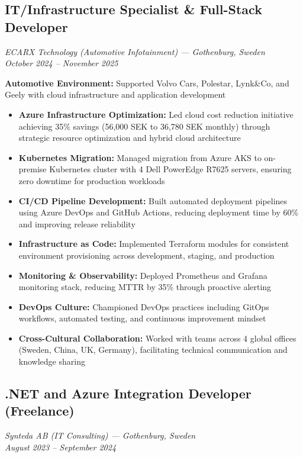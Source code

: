 \documentclass[10pt,a4paper]{article}
\begin{document}
\subsection*{IT/Infrastructure Specialist \& Full-Stack Developer}
\textit{ECARX Technology (Automotive Infotainment) — Gothenburg, Sweden}\\
\textit{October 2024 -- November 2025}

\textbf{Automotive Environment:} Supported Volvo Cars, Polestar, Lynk\&Co, and Geely with cloud infrastructure and application development

\begin{itemize}[noitemsep,leftmargin=*]
\item \textbf{Azure Infrastructure Optimization:} Led cloud cost reduction initiative achieving 35\% savings (56,000 SEK to 36,780 SEK monthly) through strategic resource optimization and hybrid cloud architecture
\item \textbf{Kubernetes Migration:} Managed migration from Azure AKS to on-premise Kubernetes cluster with 4 Dell PowerEdge R7625 servers, ensuring zero downtime for production workloads
\item \textbf{CI/CD Pipeline Development:} Built automated deployment pipelines using Azure DevOps and GitHub Actions, reducing deployment time by 60\% and improving release reliability
\item \textbf{Infrastructure as Code:} Implemented Terraform modules for consistent environment provisioning across development, staging, and production
\item \textbf{Monitoring \& Observability:} Deployed Prometheus and Grafana monitoring stack, reducing MTTR by 35\% through proactive alerting
\item \textbf{DevOps Culture:} Championed DevOps practices including GitOps workflows, automated testing, and continuous improvement mindset
\item \textbf{Cross-Cultural Collaboration:} Worked with teams across 4 global offices (Sweden, China, UK, Germany), facilitating technical communication and knowledge sharing
\end{itemize}

\subsection*{.NET and Azure Integration Developer (Freelance)}
\textit{Synteda AB (IT Consulting) — Gothenburg, Sweden}\\
\textit{August 2023 -- September 2024}
\end{document}
